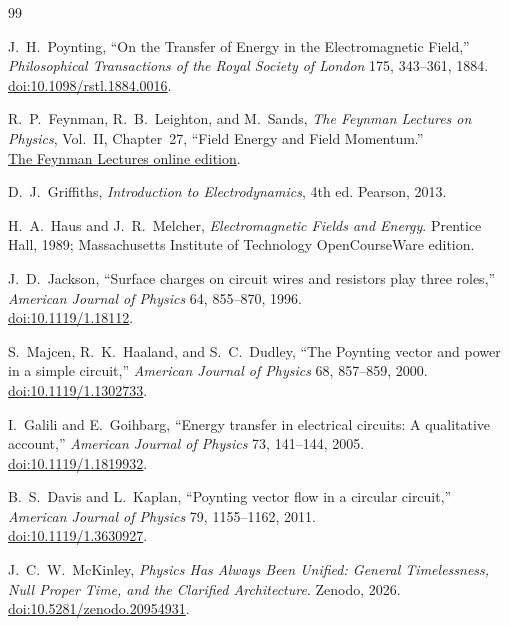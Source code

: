 \documentclass[12pt,onecolumn]{article}
\begin{document}
\begin{thebibliography}{99}

J.~H.~Poynting,
``On the Transfer of Energy in the Electromagnetic Field,''
\textit{Philosophical Transactions of the Royal Society of London} 175,
343--361, 1884.\\
\href{https://doi.org/10.1098/rstl.1884.0016}{doi:10.1098/rstl.1884.0016}.

R.~P.~Feynman, R.~B.~Leighton, and M.~Sands,
\textit{The Feynman Lectures on Physics}, Vol.~II, Chapter~27,
``Field Energy and Field Momentum.''\\
\href{https://www.feynmanlectures.caltech.edu/II_27.html}{The Feynman Lectures online edition}.

D.~J.~Griffiths,
\textit{Introduction to Electrodynamics}, 4th ed.
Pearson, 2013.

H.~A.~Haus and J.~R.~Melcher,
\textit{Electromagnetic Fields and Energy}.
Prentice Hall, 1989; Massachusetts Institute of Technology OpenCourseWare edition.

J.~D.~Jackson,
``Surface charges on circuit wires and resistors play three roles,''
\textit{American Journal of Physics} 64,
855--870, 1996.\\
\href{https://doi.org/10.1119/1.18112}{doi:10.1119/1.18112}.

S.~Majcen, R.~K.~Haaland, and S.~C.~Dudley,
``The Poynting vector and power in a simple circuit,''
\textit{American Journal of Physics} 68,
857--859, 2000.\\
\href{https://doi.org/10.1119/1.1302733}{doi:10.1119/1.1302733}.

I.~Galili and E.~Goihbarg,
``Energy transfer in electrical circuits: A qualitative account,''
\textit{American Journal of Physics} 73,
141--144, 2005.\\
\href{https://doi.org/10.1119/1.1819932}{doi:10.1119/1.1819932}.

B.~S.~Davis and L.~Kaplan,
``Poynting vector flow in a circular circuit,''
\textit{American Journal of Physics} 79,
1155--1162, 2011.\\
\href{https://doi.org/10.1119/1.3630927}{doi:10.1119/1.3630927}.

J.~C.~W.~McKinley,
\textit{Physics Has Always Been Unified: General Timelessness, Null Proper Time, and the Clarified Architecture}.
Zenodo, 2026.\\
\href{https://doi.org/10.5281/zenodo.20954931}{doi:10.5281/zenodo.20954931}.


\end{thebibliography}
\end{document}
